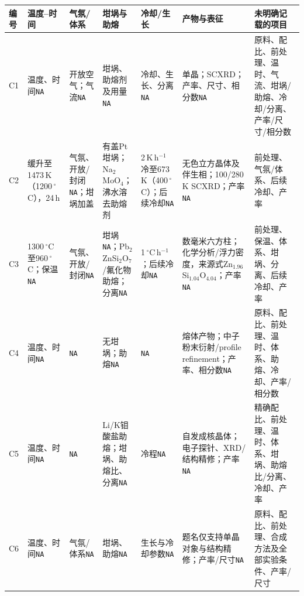 \begin{table}[p]
\vspace{4pt}
\begin{tabular}{P{0.045\textwidth}P{0.15\textwidth}P{0.12\textwidth}P{0.17\textwidth}P{0.15\textwidth}P{0.17\textwidth}P{0.14\textwidth}}
\toprule
编号 & 温度--时间 & 气氛/体系 & 坩埚与助熔 & 冷却/生长 & 产物与表征 & 未明确记载的项目\\
\midrule
C1 & 温度、时间\texttt{NA} & 开放空气；气流\texttt{NA} & 坩埚、助熔剂及用量\texttt{NA} & 冷却、生长、分离\texttt{NA} & 单晶；SCXRD；产率、尺寸、相分数\texttt{NA} & 原料、配比、前处理、温时、气流、坩埚/助熔、冷却/分离、产率/尺寸/相分数\\
C2 & 缓升至1473\,K（1200\,$^\circ$C），24\,h & 气氛、开放/封闭\texttt{NA}；坩埚加盖 & 有盖Pt坩埚；Na$_2$MoO$_4$；沸水溶去助熔剂 & 2\,K\,h$^{-1}$冷至673\,K（400\,$^\circ$C）；后续冷却\texttt{NA} & 无色立方晶体及伴生相；100/280\,K SCXRD；产率\texttt{NA} & 前处理、气氛/体系、后续冷却、产率\\
C3 & 1300\,$^\circ$C至960\,$^\circ$C；保温\texttt{NA} & 气氛、开放/封闭\texttt{NA} & 坩埚\texttt{NA}；Pb$_2$ZnSi$_2$O$_7$/氟化物助熔；分离\texttt{NA} & 1\,$^\circ$C\,h$^{-1}$；后续冷却\texttt{NA} & 数毫米六方柱；化学分析/浮力密度，来源式Zn$_{1.96}$Si$_{1.04}$O$_{4.04}$；产率\texttt{NA} & 前处理、保温、体系、坩埚、分离、后续冷却、产率\\
C4 & 温度、时间\texttt{NA} & \texttt{NA} & 无坩埚；助熔\texttt{NA} & \texttt{NA} & 熔体产物；中子粉末衍射/profile refinement；产率、相分数\texttt{NA} & 原料、配比、前处理、温时、体系、助熔、冷却、产率/相分数\\
C5 & 温度、时间\texttt{NA} & \texttt{NA} & Li/K钼酸盐助熔；坩埚、助熔比、分离\texttt{NA} & 冷程\texttt{NA} & 自发成核晶体；电子探针、XRD/结构精修；产率\texttt{NA} & 精确配比、前处理、温时、体系、坩埚、助熔比/分离、冷却、产率\\
C6 & 温度、时间\texttt{NA} & 气氛/体系\texttt{NA} & 坩埚、助熔\texttt{NA} & 生长与冷却参数\texttt{NA} & 题名仅支持单晶对象与结构精修；产率/尺寸\texttt{NA} & 原料、配比、前处理、合成方法及全部实验条件、产率/尺寸\\
\bottomrule
\end{tabular}
\end{table}
